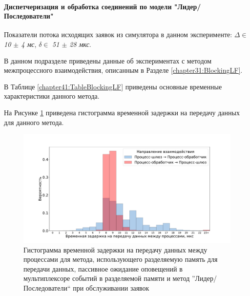 \paragraph{Диспетчеризация и обработка соединений по модели "Лидер/Последователи"}

Показатели потока исходящих заявок из симулятора в данном эксперименте: $\Delta \in$ \textit{10 $\pm$ 4 мс}, $\delta \in$ \textit{51 $\pm$ 28 мкс}.

В данном подразделе приведены данные об экспериментах с методом межпроцессного взаимодействия, описанным в Разделе \ref{chapter31:BlockingLF}.

В Таблице \ref{chapter41:TableBlockingLF} приведены основные временные характеристики данного метода.

На Рисунке \ref{chapter41:FigBlockingLF} приведена гистограмма временной задержки на передачу данных для данного метода.

\begin{figure}[!h]
\caption{Гистограмма временной задержки на передачу данных между процессами для метода, использующего разделяемую память для передачи данных, пассивное ожидание оповещений в мультиплексоре событий в разделяемой памяти и метод ''Лидер/Последователи`` при обслуживании заявок}
\label{chapter41:FigBlockingLF}
\includegraphics[width=\textwidth]{../../graphics/hist/BlockingLF}
\end{figure}

